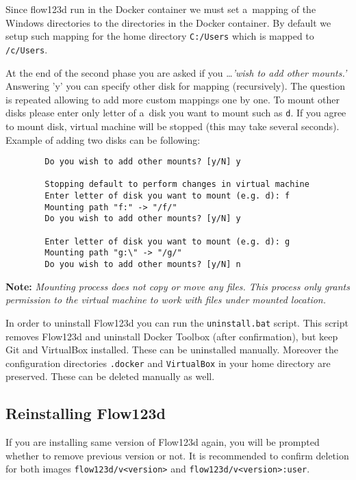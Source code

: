 \begin{enumerate}
	Since flow123d run in the Docker container we must set a~mapping of the Windows directories to the directories in the Docker container. 
	By default we setup such mapping for the home directory \verb'C:/Users' which is mapped to \verb'/c/Users'. 
	
	At the end of the second phase you are asked if you \dots \emph{'wish to add other mounts.'} Answering 'y' you can specify other disk for mapping 
	(recursively). The question is repeated allowing to add more custom mappings one by one. To mount other disks please enter only letter 
	of a~disk you want to mount such as \verb'd'.
	If you agree to mount disk, virtual machine will be stopped 
	(this may take several seconds). Example of adding two disks can be following:
	\begin{verbatim}
		Do you wish to add other mounts? [y/N] y
		
		Stopping default to perform changes in virtual machine
		Enter letter of disk you want to mount (e.g. d): f
		Mounting path "f:" -> "/f/"
		Do you wish to add other mounts? [y/N] y
		
		Enter letter of disk you want to mount (e.g. d): g
		Mounting path "g:\" -> "/g/"
		Do you wish to add other mounts? [y/N] n
	\end{verbatim}
	
	\textbf{Note:}
	\textit{Mounting process does not copy or move any files. This process only grants permission to the virtual machine to work with files under mounted location.}
\end{enumerate}

In order to uninstall Flow123d you can run the \verb'uninstall.bat' script. This script removes Flow123d 
and uninstall Docker Toolbox (after confirmation), but keep Git and VirtualBox installed. These can be uninstalled manually. 
Moreover the configuration directories \verb'.docker' and \verb'VirtualBox' in your home directory are preserved. These can be deleted manually as well. 




\subsection{Reinstalling Flow123d}
\label{duplicit-image}
If you are installing same version of Flow123d again, you will be prompted whether to remove previous version or not. 
It is recommended to confirm deletion for both images \verb'flow123d/v<version>' and \verb'flow123d/v<version>:user'.


